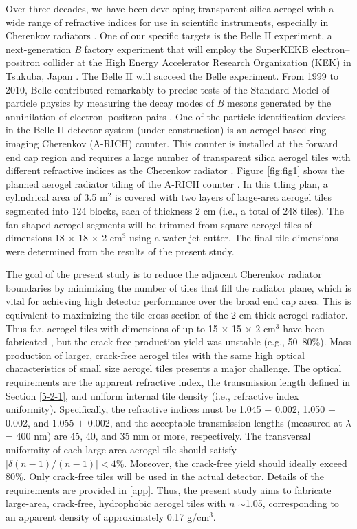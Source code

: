 \documentclass[5p,twocolumn]{elsarticle}
\begin{document}
Over three decades, we have been developing transparent silica aerogel with a wide range of refractive indices for use in scientific instruments, especially in Cherenkov radiators \cite{cite2,cite4,cite7,cite8,cite9,cite10,cite11,cite12}. One of our specific targets is the Belle II experiment, a next-generation \textit{B} factory experiment that will employ the SuperKEKB electron--positron collider at the High Energy Accelerator Research Organization (KEK) in Tsukuba, Japan \cite{cite13}. The Belle II will succeed the Belle experiment. From 1999 to 2010, Belle contributed remarkably to precise tests of the Standard Model of particle physics by measuring the decay modes of \textit{B} mesons generated by the annihilation of electron--positron pairs \cite{cite14}. One of the particle identification devices in the Belle II detector system (under construction) is an aerogel-based ring-imaging Cherenkov (A-RICH) counter. This counter is installed at the forward end cap region and requires a large number of transparent silica aerogel tiles with different refractive indices as the Cherenkov radiator \cite{cite15}. Figure \ref{fig:fig1} shows the planned aerogel radiator tiling of the A-RICH counter \cite{cite16}. In this tiling plan, a cylindrical area of 3.5 m$^2$ is covered with two layers of large-area aerogel tiles segmented into 124 blocks, each of thickness 2 cm (i.e., a total of 248 tiles). The fan-shaped aerogel segments will be trimmed from square aerogel tiles of dimensions 18 $\times$ 18 $\times $ 2 cm$^3$ using a water jet cutter. The final tile dimensions were determined from the results of the present study.

The goal of the present study is to reduce the adjacent Cherenkov radiator boundaries by minimizing the number of tiles that fill the radiator plane, which is vital for achieving high detector performance over the broad end cap area. This is equivalent to maximizing the tile cross-section of the 2 cm-thick aerogel radiator. Thus far, aerogel tiles with dimensions of up to 15 $\times $ 15 $\times $ 2 cm$^3$ have been fabricated \cite{cite10}, but the crack-free production yield was unstable (e.g., 50--80\%). Mass production of larger, crack-free aerogel tiles with the same high optical characteristics of small size aerogel tiles presents a major challenge. The optical requirements are the apparent refractive index, the transmission length defined in Section \ref{5-2-1}, and uniform internal tile density (i.e., refractive index uniformity). Specifically, the refractive indices must be 1.045 $\pm $ 0.002, 1.050 $\pm $ 0.002, and 1.055 $\pm $ 0.002, and the acceptable transmission lengths (measured at $\lambda $ = 400 nm) are 45, 40, and 35 mm or more, respectively. The transversal uniformity of each large-area aerogel tile should satisfy $|\delta (n - 1)/(n - 1)| < 4\%$. Moreover, the crack-free yield should ideally exceed 80\%. Only crack-free tiles will be used in the actual detector. Details of the requirements are provided in \ref{app}. Thus, the present study aims to fabricate large-area, crack-free, hydrophobic aerogel tiles with $n$ $\sim $1.05, corresponding to an apparent density of approximately 0.17 g/cm$^3$.
\end{document}
